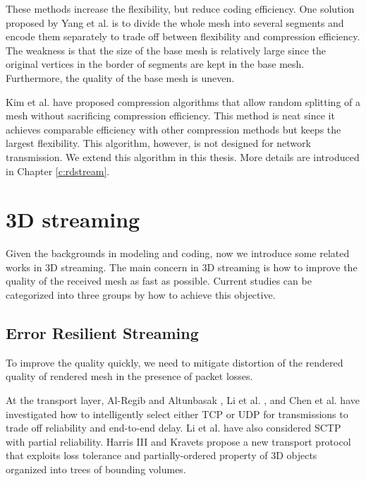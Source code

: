 \documentclass[11pt, a4paper]{report}
\begin{document}
    These methods increase the flexibility, but reduce coding efficiency.
    One solution proposed by Yang et al. \cite{progressive:Yang}
    is to divide the whole mesh into several segments and encode them
    separately to trade off between flexibility and compression efficiency.
    The weakness is that the size of the base mesh is relatively large
    since the original vertices in the border of segments are kept in the base
    mesh. Furthermore, the quality of the base mesh is uneven.

    Kim et al. \cite{multiresolution:kim}
    have proposed compression algorithms that allow random splitting of a mesh without
    sacrificing compression efficiency. This method is neat since it achieves comparable
    efficiency with other compression methods but keeps the largest flexibility.
    This algorithm, however, is not designed for 
	network transmission.  We extend this algorithm in this thesis. More details are introduced
    in Chapter \ref{c:rdstream}.  
    
    \section{3D streaming}
    \label{s:related:streaming}
    Given the backgrounds in modeling and coding, now we introduce some
    related works in 3D streaming. 
    The main concern in 3D streaming is how to improve the quality of the received
    mesh as fast as possible. Current studies can be categorized into three groups
    by how to achieve this objective.
    
    \subsection{Error Resilient Streaming}
    To improve the quality quickly, we need to mitigate distortion of the 
    rendered quality of rendered mesh in the presence of packet losses.

    At the transport layer, Al-Regib and Altunbasak \cite{3tpregib}, Li
    et al. \cite{Li2006}, and Chen et al. \cite{chen05hybrid} have
    investigated how to intelligently select either TCP or UDP for
    transmissions to trade off reliability and end-to-end delay.  Li et
    al. have also considered SCTP with partial reliability.
    Harris III and Kravets \cite{harris:design} propose a new
    transport protocol that exploits loss tolerance and
    partially-ordered property of 3D objects organized into trees of
    bounding volumes.
\end{document}
